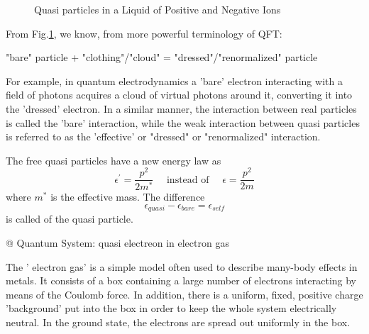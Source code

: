 \begin{easylist}
\begin{figure}[H]

    \caption{Quasi particles in a Liquid of Positive and Negative Ions}
    \label{fig:quasi-particle-example}
\end{figure}
From Fig.\ref{fig:quasi-particle-example}, we know, from more powerful terminology of QFT:
\begin{center}
    "bare" particle + "clothing"/"cloud" = "dressed"/"renormalized" particle
\end{center}
For example, in quantum electrodynamics a 'bare' electron interacting with a field of photons acquires a cloud of virtual photons around it, converting it into the 'dressed' electron. In a similar manner, the interaction between real particles is called the 'bare' interaction, while the weak interaction between quasi particles is referred to as the 'effective' or "dressed" or "renormalized" interaction. 

The free quasi particles have a new energy law as 
$$\epsilon^{\prime}=\frac{p^{2}}{2 m^{*}} \quad \text { instead of } \quad \epsilon=\frac{p^{2}}{2 m}$$
where $m^*$ is the effective mass. The difference 
$$\epsilon_{quasi}-\epsilon_{bare}=\epsilon_{self}$$
is called  of the quasi particle.

@ Quantum System: quasi electreon in electron gas

The ' electron gas' is a simple model often used to describe many-body effects in metals. It consists of a box containing a large number of electrons interacting by means of the Coulomb force. In addition, there is a uniform, fixed, positive charge 'background' put into the box in order to keep the whole system electrically neutral. In the ground state, the electrons are spread out uniformly in the box.


\end{easylist}
